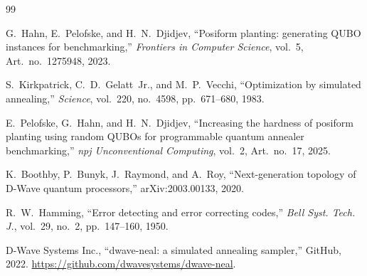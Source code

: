 \documentclass[10pt, conference]{IEEEtran}
\begin{document}

\begin{thebibliography}{99}
\scriptsize\setlength{\itemsep}{0pt}

G.~Hahn, E.~Pelofske, and H.~N.~Djidjev,
``Posiform planting: generating QUBO instances for benchmarking,''
\emph{Frontiers in Computer Science}, vol.~5, Art.~no.~1275948, 2023.

S.~Kirkpatrick, C.~D.~Gelatt~Jr., and M.~P.~Vecchi,
``Optimization by simulated annealing,''
\emph{Science}, vol.~220, no.~4598, pp.~671--680, 1983.

E.~Pelofske, G.~Hahn, and H.~N.~Djidjev,
``Increasing the hardness of posiform planting using random QUBOs for programmable quantum annealer benchmarking,''
\emph{npj Unconventional Computing}, vol.~2, Art.~no.~17, 2025.

K.~Boothby, P.~Bunyk, J.~Raymond, and A.~Roy,
``Next-generation topology of D-Wave quantum processors,''
arXiv:2003.00133, 2020.

R.~W.~Hamming, ``Error detecting and error correcting codes,''
\emph{Bell Syst. Tech. J.}, vol.~29, no.~2, pp.~147--160, 1950.

D-Wave Systems Inc., ``dwave-neal: a simulated annealing sampler,'' GitHub,
2022. \url{https://github.com/dwavesystems/dwave-neal}.

\end{thebibliography}
\end{document}
